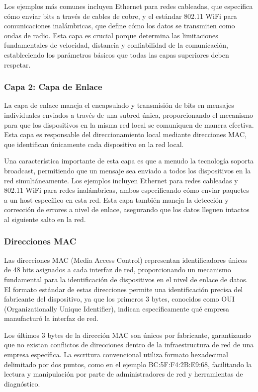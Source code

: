 Los ejemplos más comunes incluyen Ethernet para redes cableadas, que especifica cómo enviar bits a través de cables de cobre, y el estándar 802.11 WiFi para comunicaciones inalámbricas, que define cómo los datos se transmiten como ondas de radio. Esta capa es crucial porque determina las limitaciones fundamentales de velocidad, distancia y confiabilidad de la comunicación, estableciendo los parámetros básicos que todas las capas superiores deben respetar.

\subsubsection{Capa 2: Capa de Enlace}

La capa de enlace maneja el encapsulado y transmisión de bits en mensajes individuales enviados a través de una subred única, proporcionando el mecanismo para que los dispositivos en la misma red local se comuniquen de manera efectiva. Esta capa es responsable del direccionamiento local mediante direcciones MAC, que identifican únicamente cada dispositivo en la red local.

Una característica importante de esta capa es que a menudo la tecnología soporta broadcast, permitiendo que un mensaje sea enviado a todos los dispositivos en la red simultáneamente. Los ejemplos incluyen Ethernet para redes cableadas y 802.11 WiFi para redes inalámbricas, ambos especificando cómo enviar paquetes a un host específico en esta red. Esta capa también maneja la detección y corrección de errores a nivel de enlace, asegurando que los datos lleguen intactos al siguiente salto en la red.

\subsubsection{Direcciones MAC}

Las direcciones MAC (Media Access Control) representan identificadores únicos de 48 bits asignados a cada interfaz de red, proporcionando un mecanismo fundamental para la identificación de dispositivos en el nivel de enlace de datos. El formato estándar de estas direcciones permite una identificación precisa del fabricante del dispositivo, ya que los primeros 3 bytes, conocidos como OUI (Organizationally Unique Identifier), indican específicamente qué empresa manufacturó la interfaz de red.

Los últimos 3 bytes de la dirección MAC son únicos por fabricante, garantizando que no existan conflictos de direcciones dentro de la infraestructura de red de una empresa específica. La escritura convencional utiliza formato hexadecimal delimitado por dos puntos, como en el ejemplo BC:5F:F4:2B:E9:68, facilitando la lectura y manipulación por parte de administradores de red y herramientas de diagnóstico.

